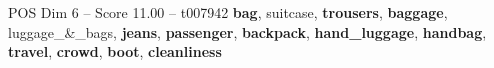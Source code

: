 \begin{textsample}{POS Dim 6 – Score 11.00 – t007942}  \label{ex:f6_pos_039}
\textbf{bag}, suitcase, \textbf{trousers}, \textbf{baggage}, luggage\_\&\_bags, \textbf{jeans}, \textbf{passenger}, \textbf{backpack}, \textbf{hand\_luggage}, \textbf{handbag}, \textbf{travel}, \textbf{crowd}, \textbf{boot}, \textbf{cleanliness}

\end{textsample}

